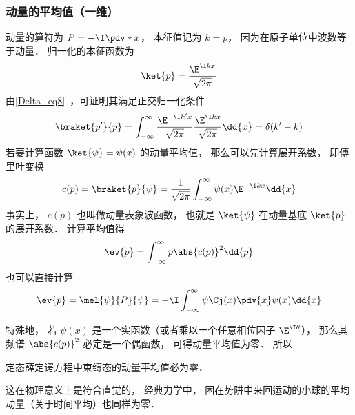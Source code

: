 \subsubsection{动量的平均值（一维）}
动量的算符为 $P = -\I\pdv*{x}$， 本征值记为 $k = p$， 因为在原子单位中波数等于动量． 归一化的本征函数为
\begin{equation}
\ket{p} = \frac{\E^{\I k x}}{\sqrt{2\pi}}
\end{equation}
由\autoref{Delta_eq8}~，可证明其满足正交归一化条件
\begin{equation}
\braket{p'}{p} = \int_{-\infty}^{\infty} \frac{\E^{-\I k' x}}{\sqrt{2\pi}} \frac{\E^{\I k x}}{\sqrt{2\pi}} \dd{x} = \delta(k' - k)
\end{equation}
若要计算函数 $\ket{\psi} = \psi(x)$ 的动量平均值， 那么可以先计算展开系数， 即傅里叶变换
\begin{equation}
c(p) = \braket{p}{\psi} = \frac{1}{\sqrt{2\pi}}\int_{-\infty}^{\infty} \psi(x)\E^{-\I kx} \dd{x}
\end{equation}
事实上， $c(p)$ 也叫做动量表象波函数， 也就是 $\ket{\psi}$ 在动量基底 $\ket{p}$ 的展开系数． 计算平均值得
\begin{equation}
\ev{p} = \int_{-\infty}^{\infty} p \abs{c(p)}^2\dd{p}
\end{equation}
也可以直接计算
\begin{equation}
\ev{p} = \mel{\psi}{P}{\psi} = -\I\int_{-\infty}^{\infty} \psi\Cj(x) \pdv{x} \psi(x) \dd{x}
\end{equation}


特殊地， 若 $\psi(x)$ 是一个实函数（或者乘以一个任意相位因子 $\E^{\I \theta}$）， 那么其频谱 $\abs{c(p)}^2$ 必定是一个偶函数， 可得动量平均值为零． 所以
\begin{theorem}{}
定态薛定谔方程中束缚态的动量平均值必为零．
\end{theorem}
这在物理意义上是符合直觉的， 经典力学中， 困在势阱中来回运动的小球的平均动量（关于时间平均）也同样为零．

